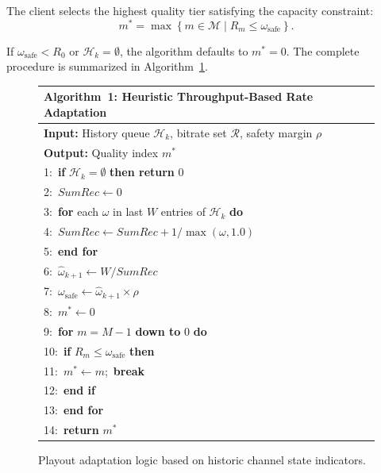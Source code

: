 \documentclass[conference]{IEEEtran}
\begin{document}
The client selects the highest quality tier satisfying the capacity
constraint:
\begin{equation}
  m^*=\max\!\left\{m\in\mathcal{M}\mid R_m\le\omega_{\text{safe}}\right\}.
  \label{eq:throughput_selection}
\end{equation}

If $\omega_{\text{safe}}<R_0$ or $\mathcal{H}_k=\emptyset$, the algorithm
defaults to $m^*=0$.  The complete procedure is summarized in
Algorithm~\ref{alg:throughput_abr}.

\begin{figure}[htbp]
\renewcommand{\arraystretch}{1.2}
\centering
\begin{tabular}{p{}}
\hline
\textbf{Algorithm~1: Heuristic Throughput-Based Rate Adaptation}\\
\hline
\textbf{Input:} History queue $\mathcal{H}_k$, bitrate set $\mathcal{R}$,
  safety margin $\rho$\\
\textbf{Output:} Quality index $m^*$\\
1:~\textbf{if} $\mathcal{H}_k=\emptyset$ \textbf{then return} $0$\\
2:~$\mathit{SumRec}\leftarrow 0$\\
3:~\textbf{for} each $\omega$ in last $W$ entries of $\mathcal{H}_k$
  \textbf{do}\\
4:~\quad$\mathit{SumRec}\leftarrow\mathit{SumRec}+1/\max(\omega,1.0)$\\
5:~\textbf{end for}\\
6:~$\hat{\omega}_{k+1}\leftarrow W/\mathit{SumRec}$\\
7:~$\omega_{\text{safe}}\leftarrow\hat{\omega}_{k+1}\times\rho$\\
8:~$m^*\leftarrow 0$\\
9:~\textbf{for} $m=M{-}1$ \textbf{down to} $0$ \textbf{do}\\
10:~\quad\textbf{if} $R_m\le\omega_{\text{safe}}$ \textbf{then}\\
11:~\qquad$m^*\leftarrow m$;~\textbf{break}\\
12:~\quad\textbf{end if}\\
13:~\textbf{end for}\\
14:~\textbf{return} $m^*$\\
\hline
\end{tabular}
\caption{Playout adaptation logic based on historic channel state indicators.}
\label{alg:throughput_abr}
\end{figure}

\end{document}
